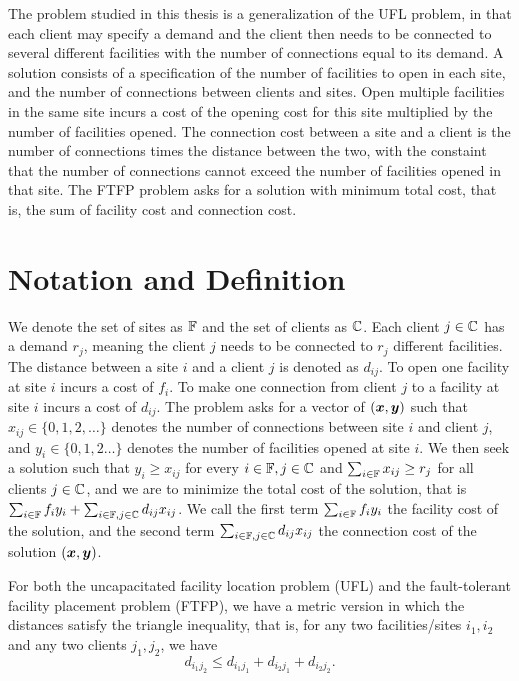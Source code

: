 \documentclass[oneside,final]{ucr}
\begin{document}
The problem studied in this thesis is a generalization of
the UFL problem, in that each client may specify a demand
and the client then needs to be connected to several
different facilities with the number of connections equal to
its demand.  A solution consists of a specification of the
number of facilities to open in each site, and the number of
connections between clients and sites. Open multiple
facilities in the same site incurs a cost of the opening
cost for this site multiplied by the number of facilities
opened. The connection cost between a site and a client is
the number of connections times the distance between the
two, with the constaint that the number of connections
cannot exceed the number of facilities opened in that
site. The FTFP problem asks for a solution with minimum
total cost, that is, the sum of facility cost and connection
cost.

\section{Notation and Definition}
We denote the set of sites as $\mathbb{F}$ and the set of
clients as $\mathbb{C}$. Each client $j \in \mathbb{C}$ has
a demand $r_j$, meaning the client $j$ needs to be connected
to $r_j$ different facilities. The distance between a site
$i$ and a client $j$ is denoted as $d_{ij}$. To open one
facility at site $i$ incurs a cost of $f_i$. To make one
connection from client $j$ to a facility at site $i$ incurs
a cost of $d_{ij}$. The problem asks for a vector of $(\boldsymbol{x},
\boldsymbol{y})$ such that $x_{ij} \in \{0, 1, 2, \ldots\}$ denotes
the number of connections between site $i$ and client $j$,
and $y_i \in \{0, 1, 2\ldots\}$ denotes the number of
facilities opened at site $i$. We then seek a solution such
that $y_i \geq x_{ij}$ for every $i \in \mathbb{F}, j \in
\mathbb{C}$ and $\sum_{i\in\mathbb{F}} x_{ij} \geq r_j$ for
all clients $j \in \mathbb{C}$, and we are to minimize the
total cost of the solution, that is $\sum_{i \in \mathbb{F}}
f_i y_i + \sum_{i \in \mathbb{F}, j \in \mathbb{C}} d_{ij}
x_{ij}$. We call the first term $\sum_{i \in \mathbb{F}} f_i
y_i$ the facility cost of the solution, and the second term
$\sum_{i \in \mathbb{F}, j \in \mathbb{C}} d_{ij} x_{ij}$ the
connection cost of the solution $(\boldsymbol{x}, \boldsymbol{y})$.

For both the uncapacitated facility location problem (UFL)
and the fault-tolerant facility placement problem (FTFP), we
have a metric version in which the distances satisfy the
triangle inequality, that is, for any two facilities/sites
$i_1,i_2$ and any two clients $j_1,j_2$, we have
\begin{equation*}
  d_{i_1 j_2} \leq d_{i_1 j_1} + d_{i_2 j_1} + d_{i_2 j_2}.
\end{equation*}
\end{document}
